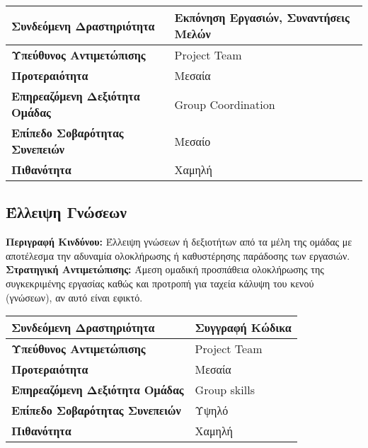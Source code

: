 \documentclass{article}
\newcommand\T{\rule{0pt}{2.6ex}}       %
\newcommand\B{\rule[-1.2ex]{0pt}{0pt}}
\begin{document}
  \begin{center}
     \begin{tabular}{|l|l|}
     \hline
      \textbf{Συνδεόμενη Δραστηριότητα} & Εκπόνηση Εργασιών, Συναντήσεις Μελών \T\B \\ 
      \hline
      \textbf{Υπεύθυνος Αντιμετώπισης} & Project Team \T\B \\
      \hline
      \textbf{Προτεραιότητα} & Μεσαία \T\B \\
      \hline
      \textbf{Επηρεαζόμενη Δεξιότητα Ομάδας} & Group Coordination \T\B \\
      \hline
      \textbf{Επίπεδο Σοβαρότητας Συνεπειών} & Μεσαίο \T\B \\
      \hline
      \textbf{Πιθανότητα} & Χαμηλή \T\B \\
      \hline
     \end{tabular}
 \end{center}
 
 \newpage
 
 \subsection{Έλλειψη Γνώσεων}
 
\textbf{Περιγραφή Κινδύνου:}  Έλλειψη γνώσεων ή δεξιοτήτων από τα μέλη της ομάδας με αποτέλεσμα την αδυναμία ολοκλήρωσης ή καθυστέρησης παράδοσης των εργασιών.\\

\textbf{Στρατηγική Αντιμετώπισης:} Άμεση ομαδική προσπάθεια ολοκλήρωσης της συγκεκριμένης εργασίας καθώς και προτροπή για ταχεία κάλυψη του κενού (γνώσεων), αν αυτό είναι εφικτό.

\vspace{0.2cm}
  
   \begin{center}
     \begin{tabular}{|l|l|}
     \hline
      \textbf{Συνδεόμενη Δραστηριότητα}  & Συγγραφή Κώδικα \T\B \\ 
      \hline
      \textbf{Υπεύθυνος Αντιμετώπισης} & Project Team \T\B \\
      \hline
      \textbf{Προτεραιότητα} & Μεσαία \T\B \\
      \hline
      \textbf{Επηρεαζόμενη Δεξιότητα Ομάδας} & Group skills\T\B \\
      \hline
      \textbf{Επίπεδο Σοβαρότητας Συνεπειών} & Υψηλό \T\B \\
      \hline
      \textbf{Πιθανότητα} & Χαμηλή \T\B \\
      \hline
     \end{tabular}
 \end{center}
 
\end{document}
